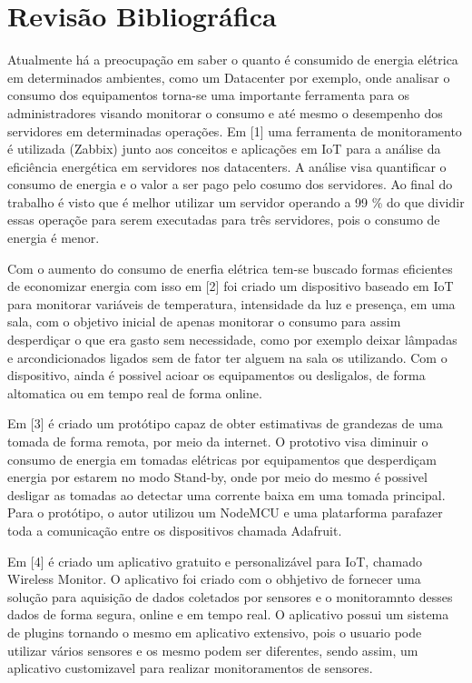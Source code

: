 \chapter{Revisão Bibliográfica}\label{CAP3}

Atualmente há a preocupação em saber o quanto é consumido de energia elétrica em determinados ambientes, como um Datacenter por exemplo, onde analisar o consumo dos equipamentos torna-se uma importante ferramenta para os administradores visando monitorar o consumo e até mesmo o desempenho dos servidores em determinadas operações. Em [1] uma ferramenta de monitoramento é utilizada (Zabbix) junto aos conceitos e aplicações em IoT para a análise da eficiência energética em servidores nos datacenters. A análise visa quantificar o consumo de energia e o valor a ser pago pelo cosumo dos servidores. Ao final do trabalho é visto que é melhor utilizar um servidor operando a 99 \% do que dividir essas operaçõe para serem executadas para três servidores, pois o consumo de energia é menor.

Com o aumento do consumo de enerfia elétrica tem-se buscado formas eficientes de economizar energia com isso em [2] foi criado um dispositivo baseado em IoT para monitorar variáveis de temperatura, intensidade da luz e presença, em uma sala, com o objetivo inicial de apenas monitorar o consumo para assim desperdiçar o que era gasto sem necessidade, como por exemplo deixar lâmpadas e arcondicionados ligados sem de fator ter alguem na sala os utilizando. Com o dispositivo, ainda é possivel acioar os equipamentos ou desligalos, de forma altomatica ou em tempo real de forma online.

Em [3] é criado um protótipo capaz de obter estimativas de grandezas de uma tomada de forma remota, por meio da internet. O prototivo visa diminuir o consumo de energia em tomadas elétricas por equipamentos que desperdiçam energia por estarem no modo Stand-by, onde por meio do mesmo é possivel desligar as tomadas ao detectar uma corrente baixa em uma tomada principal. Para o protótipo, o autor utilizou um NodeMCU e uma platarforma parafazer toda a comunicação entre os dispositivos chamada Adafruit.

Em [4] é criado um aplicativo gratuito e personalizável para IoT, chamado Wireless Monitor. O aplicativo foi criado com o obhjetivo de fornecer uma solução para aquisição de dados coletados por sensores e o monitoramnto desses dados de forma segura, online e em tempo real. O aplicativo possui um sistema de plugins tornando o mesmo em aplicativo extensivo, pois o usuario pode utilizar vários sensores e os mesmo podem ser diferentes, sendo assim, um aplicativo customizavel para realizar monitoramentos de sensores.

